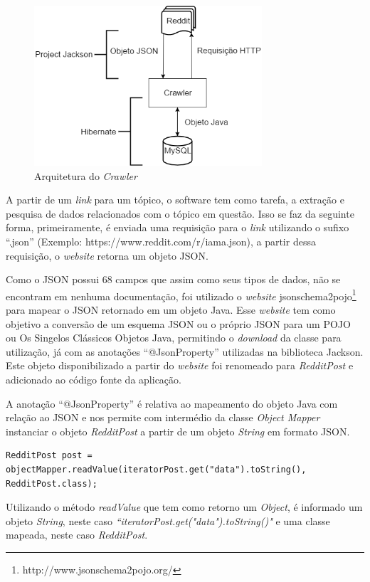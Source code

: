 \begin{figure}[htbp]
\centering
\includegraphics[height=225px]{imagens/arquitetura.png}
\caption{Arquitetura do \textit{Crawler}}
\label{fig:crawler}
\end{figure}

A partir de um \textit{link} para um tópico, o software tem como tarefa, a
extração e pesquisa de dados relacionados com o tópico em questão. Isso se faz
da seguinte forma, primeiramente, é enviada uma requisição para o \textit{link}
utilizando o sufixo ``.json'' (Exemplo: https://www.reddit.com/r/iama.json), a
partir dessa requisição, o \textit{website} retorna um objeto \ac{JSON}.

Como o \ac{JSON} possui 68 campos que assim como seus tipos de dados, não se
encontram em nenhuma documentação, foi utilizado o \textit{website}
jsonschema2pojo\footnote{http://www.jsonschema2pojo.org/} para mapear o \ac{JSON} retornado em um
objeto Java. Esse \textit{website} tem como objetivo a conversão de um esquema \ac{JSON} ou o próprio \ac{JSON} para um \ac{POJO} ou Os Singelos Clássicos Objetos Java, permitindo
o \textit{download} da classe para utilização, já com as anotações
``@JsonProperty'' utilizadas na biblioteca Jackson. Este objeto disponibilizado a
partir do \textit{website} foi renomeado para \textit{RedditPost} e adicionado
ao código fonte da aplicação.

A anotação ``@JsonProperty'' é relativa ao
mapeamento do objeto Java com relação ao \ac{JSON} e nos permite com
intermédio da classe \textit{Object Mapper} instanciar o objeto
\textit{RedditPost} a partir de um objeto \textit{String} em formato \ac{JSON}.

\begin{lstlisting}
RedditPost post = objectMapper.readValue(iteratorPost.get("data").toString(),
RedditPost.class);
\end{lstlisting}

Utilizando o método \textit{readValue} que tem como retorno um \textit{Object},
é informado um objeto \textit{String}, neste caso
\textit{``iteratorPost.get("data").toString()"} e uma classe mapeada, neste caso
\textit{RedditPost}.

